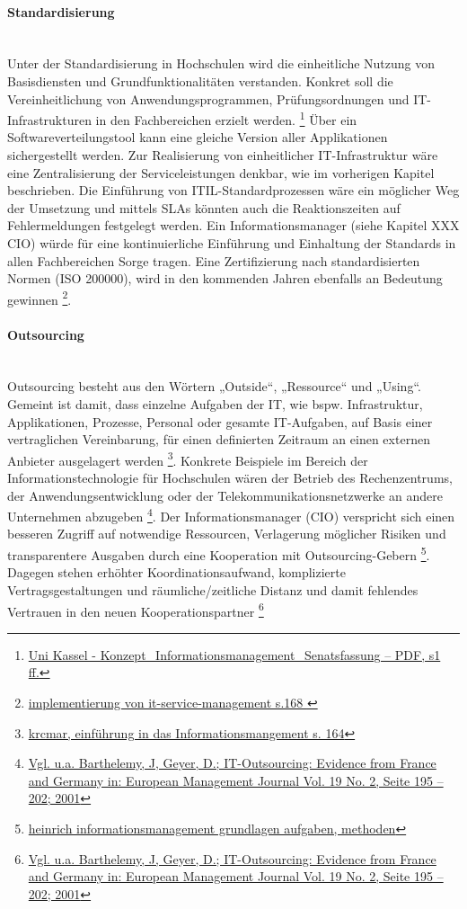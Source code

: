 \documentclass[a4paper, 12pt]{scrreprt}
\begin{document}
\paragraph{Standardisierung}\mbox{}\\
Unter der Standardisierung in Hochschulen wird die einheitliche Nutzung von Basisdiensten und Grundfunktionalitäten verstanden. Konkret soll die Vereinheitlichung von Anwendungsprogrammen, Prüfungsordnungen und IT-Infrastrukturen in den Fachbereichen erzielt werden. \footnote{\url{Uni Kassel - Konzept_Informationsmanagement_Senatsfassung – PDF, s1 ff.}}
Über ein Softwareverteilungstool kann eine gleiche Version aller Applikationen sichergestellt werden. Zur Realisierung von einheitlicher IT-Infrastruktur wäre eine Zentralisierung der Serviceleistungen denkbar, wie im vorherigen Kapitel beschrieben. Die Einführung von ITIL-Standardprozessen wäre ein möglicher Weg der Umsetzung und mittels SLAs könnten auch die Reaktionszeiten auf Fehlermeldungen festgelegt werden. Ein Informationsmanager (siehe Kapitel XXX CIO) würde für eine kontinuierliche Einführung und Einhaltung der Standards in allen Fachbereichen Sorge tragen. Eine Zertifizierung nach standardisierten Normen (ISO 200000), wird in den kommenden Jahren ebenfalls an Bedeutung gewinnen \footnote{\url{implementierung von it-service-management s.168 }}.


\paragraph{Outsourcing}\mbox{}\\
Outsourcing besteht aus den Wörtern „Outside“, „Ressource“ und „Using“. Gemeint ist damit, dass einzelne Aufgaben der IT, wie bspw. Infrastruktur, Applikationen, Prozesse, Personal oder gesamte IT-Aufgaben, auf Basis einer vertraglichen Vereinbarung, für einen definierten Zeitraum an einen externen Anbieter ausgelagert werden \footnote{\url{krcmar, einführung in das Informationsmangement s. 164}}. Konkrete Beispiele im Bereich der Informationstechnologie für Hochschulen wären der Betrieb des Rechenzentrums, der Anwendungsentwicklung oder der Telekommunikationsnetzwerke an andere Unternehmen abzugeben \footnote{\url{Vgl. u.a. Barthelemy, J, Geyer, D.; IT-Outsourcing: Evidence from France and Germany in: European Management Journal Vol. 19 No. 2, Seite 195 – 202; 2001}}. Der Informationsmanager (CIO) verspricht sich einen besseren Zugriff auf notwendige Ressourcen, Verlagerung möglicher Risiken und transparentere Ausgaben durch eine Kooperation mit Outsourcing-Gebern \footnote{\url{heinrich informationsmanagement grundlagen aufgaben, methoden}}. Dagegen stehen erhöhter Koordinationsaufwand, komplizierte Vertragsgestaltungen und räumliche/zeitliche Distanz und damit fehlendes Vertrauen in den neuen Kooperationspartner \footnote{\url{Vgl. u.a. Barthelemy, J, Geyer, D.; IT-Outsourcing: Evidence from France and Germany in: European Management Journal Vol. 19 No. 2, Seite 195 – 202; 2001}}
\end{document}
